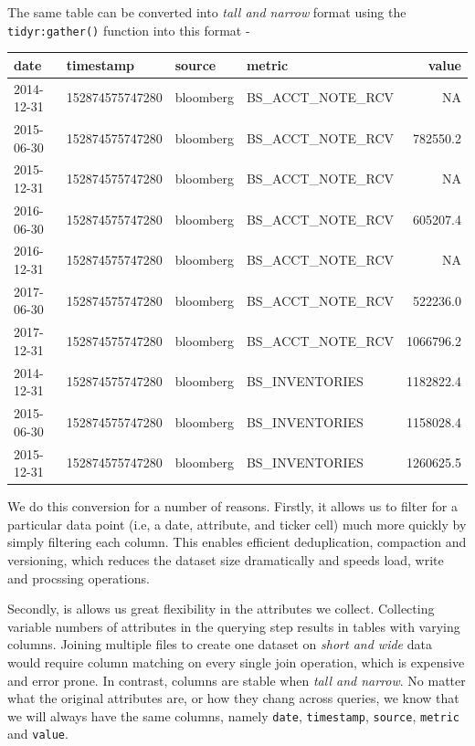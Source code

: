 \documentclass[11pt,preprint, authoryear]{elsarticle}
\numberwithin{equation}{section}
\numberwithin{figure}{section}
\numberwithin{table}{section}
\begin{document}
The same table can be converted into \emph{tall and narrow} format using
the \texttt{tidyr:gather()} function into this format -

\begin{longtable}[]{@{}llllr@{}}
\toprule
date & timestamp & source & metric & value\tabularnewline
\midrule
\endhead
2014-12-31 & 152874575747280 & bloomberg & BS\_ACCT\_NOTE\_RCV &
NA\tabularnewline
2015-06-30 & 152874575747280 & bloomberg & BS\_ACCT\_NOTE\_RCV &
782550.2\tabularnewline
2015-12-31 & 152874575747280 & bloomberg & BS\_ACCT\_NOTE\_RCV &
NA\tabularnewline
2016-06-30 & 152874575747280 & bloomberg & BS\_ACCT\_NOTE\_RCV &
605207.4\tabularnewline
2016-12-31 & 152874575747280 & bloomberg & BS\_ACCT\_NOTE\_RCV &
NA\tabularnewline
2017-06-30 & 152874575747280 & bloomberg & BS\_ACCT\_NOTE\_RCV &
522236.0\tabularnewline
2017-12-31 & 152874575747280 & bloomberg & BS\_ACCT\_NOTE\_RCV &
1066796.2\tabularnewline
2014-12-31 & 152874575747280 & bloomberg & BS\_INVENTORIES &
1182822.4\tabularnewline
2015-06-30 & 152874575747280 & bloomberg & BS\_INVENTORIES &
1158028.4\tabularnewline
2015-12-31 & 152874575747280 & bloomberg & BS\_INVENTORIES &
1260625.5\tabularnewline
\bottomrule
\end{longtable}

We do this conversion for a number of reasons. Firstly, it allows us to
filter for a particular data point (i.e, a date, attribute, and ticker
cell) much more quickly by simply filtering each column. This enables
efficient deduplication, compaction and versioning, which reduces the
dataset size dramatically and speeds load, write and procssing
operations.

Secondly, is allows us great flexibility in the attributes we collect.
Collecting variable numbers of attributes in the querying step results
in tables with varying columns. Joining multiple files to create one
dataset on \emph{short and wide} data would require column matching on
every single join operation, which is expensive and error prone. In
contrast, columns are stable when \emph{tall and narrow}. No matter what
the original attributes are, or how they chang across queries, we know
that we will always have the same columns, namely \texttt{date},
\texttt{timestamp}, \texttt{source}, \texttt{metric} and \texttt{value}.
\end{document}
